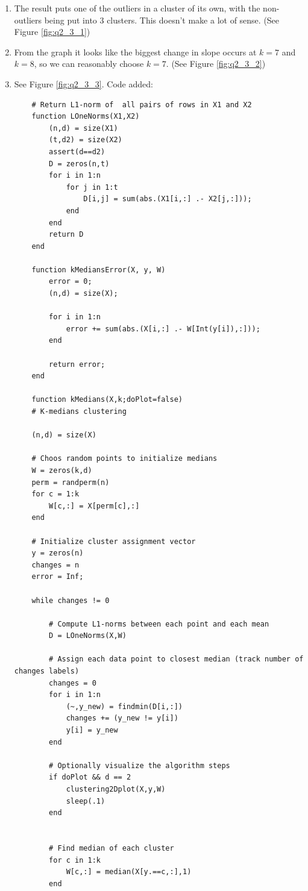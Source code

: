 \documentclass{article}
\begin{document}
 \begin{enumerate}
 \item The result puts one of the outliers in a cluster of its own, with the non-outliers being put into 3 clusters. This doesn't make a lot of sense. (See Figure \ref{fig:q2_3_1})
 \item From the graph it looks like the biggest change in slope occurs at $k = 7$ and $k = 8$, so we can reasonably choose $k = 7$. (See Figure \ref{fig:q2_3_2})
 \item See Figure \ref{fig:q2_3_3}. Code added:
 \begin{verbatim}
    # Return L1-norm of  all pairs of rows in X1 and X2
    function LOneNorms(X1,X2)
        (n,d) = size(X1)
        (t,d2) = size(X2)
        assert(d==d2)
        D = zeros(n,t)
        for i in 1:n
            for j in 1:t
                D[i,j] = sum(abs.(X1[i,:] .- X2[j,:]));
            end
        end
        return D
    end

    function kMediansError(X, y, W)
        error = 0;
        (n,d) = size(X);

        for i in 1:n
            error += sum(abs.(X[i,:] .- W[Int(y[i]),:]));
        end

        return error;
    end

    function kMedians(X,k;doPlot=false)
    # K-medians clustering
    
    (n,d) = size(X)
    
    # Choos random points to initialize medians
    W = zeros(k,d)
    perm = randperm(n)
    for c = 1:k
        W[c,:] = X[perm[c],:]
    end
    
    # Initialize cluster assignment vector
    y = zeros(n)
    changes = n
    error = Inf;
    
    while changes != 0
    
        # Compute L1-norms between each point and each mean
        D = LOneNorms(X,W)
    
        # Assign each data point to closest median (track number of changes labels)
        changes = 0
        for i in 1:n
            (~,y_new) = findmin(D[i,:])
            changes += (y_new != y[i])
            y[i] = y_new
        end
    
        # Optionally visualize the algorithm steps
        if doPlot && d == 2
            clustering2Dplot(X,y,W)
            sleep(.1)
        end
    
    
        # Find median of each cluster
        for c in 1:k
            W[c,:] = median(X[y.==c,:],1)
        end
    

\end{verbatim}
\end{enumerate}
\end{document}
